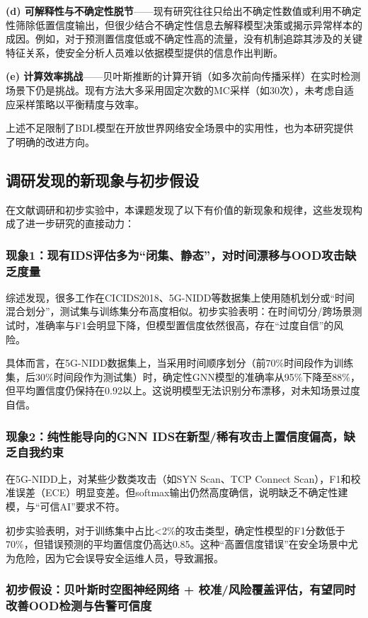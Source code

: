 \textbf{(d) 可解释性与不确定性脱节}——现有研究往往只给出不确定性数值或利用不确定性筛除低置信度输出，但很少结合不确定性信息去解释模型决策或揭示异常样本的成因。例如，对于预测置信度低或不确定性高的流量，没有机制追踪其涉及的关键特征关系，使安全分析人员难以依据模型提供的信息作出判断。

\textbf{(e) 计算效率挑战}——贝叶斯推断的计算开销（如多次前向传播采样）在实时检测场景下仍是挑战。现有方法大多采用固定次数的MC采样（如30次），未考虑自适应采样策略以平衡精度与效率。

上述不足限制了BDL模型在开放世界网络安全场景中的实用性，也为本研究提供了明确的改进方向。

\subsection{调研发现的新现象与初步假设}

在文献调研和初步实验中，本课题发现了以下有价值的新现象和规律，这些发现构成了进一步研究的直接动力：

\subsubsection{现象1：现有IDS评估多为``闭集、静态''，对时间漂移与OOD攻击缺乏度量}

综述发现，很多工作在CICIDS2018、5G-NIDD等数据集上使用随机划分或``时间混合划分''，测试集与训练集分布高度相似。初步实验表明：在时间切分/跨场景测试时，准确率与F1会明显下降，但模型置信度依然很高，存在``过度自信''的风险。

具体而言，在5G-NIDD数据集上，当采用时间顺序划分（前70\%时间段作为训练集，后30\%时间段作为测试集）时，确定性GNN模型的准确率从95\%下降至88\%，但平均置信度仍保持在0.92以上。这说明模型无法识别分布漂移，对未知场景过度自信。

\subsubsection{现象2：纯性能导向的GNN IDS在新型/稀有攻击上置信度偏高，缺乏自我约束}

在5G-NIDD上，对某些少数类攻击（如SYN Scan、TCP Connect Scan），F1和校准误差（ECE）明显变差。但softmax输出仍然高度确信，说明缺乏不确定性建模，与``可信AI''要求不符。

初步实验表明，对于训练集中占比<2\%的攻击类型，确定性模型的F1分数低于70\%，但错误预测的平均置信度仍高达0.85。这种``高置信度错误''在安全场景中尤为危险，因为它会误导安全运维人员，导致漏报。

\subsubsection{初步假设：贝叶斯时空图神经网络 + 校准/风险覆盖评估，有望同时改善OOD检测与告警可信度}

